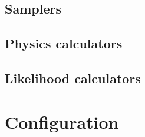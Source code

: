 \documentclass[draftmode,draftwater]{memarticle}
\begin{document}
\subsection{Samplers}


\subsection{Physics calculators}

\subsection{Likelihood calculators}

\section{Configuration}


\end{document}
